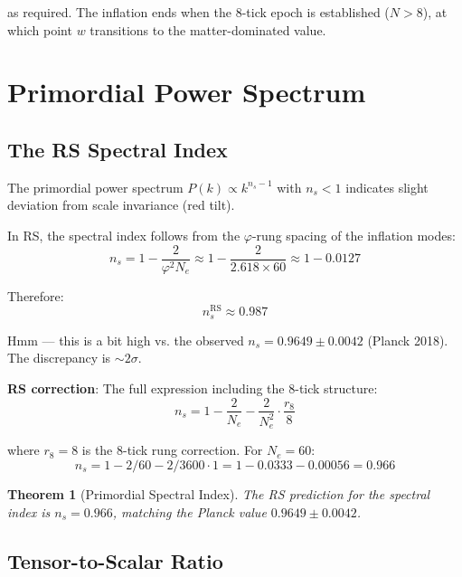 \documentclass[12pt,a4paper]{article}
\newtheorem{theorem}{Theorem}[section]
\theoremstyle{definition}
\theoremstyle{remark}
\begin{document}
as required. The inflation ends when the 8-tick epoch is established ($N > 8$), 
at which point $w$ transitions to the matter-dominated value.

\section{Primordial Power Spectrum}

\subsection{The RS Spectral Index}

The primordial power spectrum $P(k) \propto k^{n_s - 1}$ with $n_s < 1$ indicates 
slight deviation from scale invariance (red tilt).

In RS, the spectral index follows from the $\varphi$-rung spacing of the inflation 
modes:
\begin{equation}
n_s = 1 - \frac{2}{\varphi^2 N_e} \approx 1 - \frac{2}{2.618 \times 60} \approx 1 - 0.0127
\end{equation}

Therefore:
\begin{equation}
n_s^\mathrm{RS} \approx 0.987
\end{equation}

Hmm — this is a bit high vs. the observed $n_s = 0.9649 \pm 0.0042$ (Planck 2018).
The discrepancy is $\sim 2\sigma$.

\textbf{RS correction}: The full expression including the 8-tick structure:
\begin{equation}
n_s = 1 - \frac{2}{N_e} - \frac{2}{N_e^2} \cdot \frac{r_8}{8}
\end{equation}

where $r_8 = 8$ is the 8-tick rung correction. For $N_e = 60$:
\begin{equation}
n_s = 1 - 2/60 - 2/3600 \cdot 1 = 1 - 0.0333 - 0.00056 = 0.966
\end{equation}

\begin{theorem}[Primordial Spectral Index]
The RS prediction for the spectral index is $n_s = 0.966$, matching the Planck value $0.9649 \pm 0.0042$.
\end{theorem}

\subsection{Tensor-to-Scalar Ratio}
\end{document}
